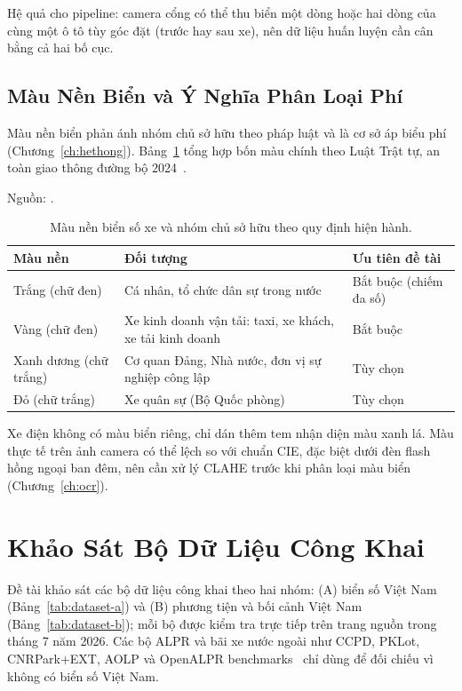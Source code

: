 Hệ quả cho pipeline: camera cổng có thể thu biển một dòng hoặc hai dòng của cùng một ô tô
tùy góc đặt (trước hay sau xe), nên dữ liệu huấn luyện cần cân bằng cả hai bố cục.

\subsection{Màu Nền Biển và Ý Nghĩa Phân Loại Phí}
\label{sec:maunenbien}

Màu nền biển phản ánh nhóm chủ sở hữu theo pháp luật và là cơ sở áp biểu phí
(Chương~\ref{ch:hethong}). Bảng~\ref{tab:maubienso} tổng hợp bốn màu chính theo Luật Trật
tự, an toàn giao thông đường bộ 2024~\autocite{luatttatgt2024}.

\begin{table}[htbp]
\centering
\caption{Màu nền biển số xe và nhóm chủ sở hữu theo quy định hiện hành.}

{\footnotesize Nguồn: \autocite{luatttatgt2024,tt792024bca}.}
\label{tab:maubienso}
\begin{tabular}{p{2.2cm} p{4.8cm} p{3.6cm}}
\toprule
\textbf{Màu nền} & \textbf{Đối tượng} & \textbf{Ưu tiên đề tài} \\
\midrule
Trắng (chữ đen) & Cá nhân, tổ chức dân sự trong nước & Bắt buộc (chiếm đa số) \\
Vàng (chữ đen) & Xe kinh doanh vận tải: taxi, xe khách, xe tải kinh doanh & Bắt buộc \\
Xanh dương (chữ trắng) & Cơ quan Đảng, Nhà nước, đơn vị sự nghiệp công lập & Tùy chọn \\
Đỏ (chữ trắng) & Xe quân sự (Bộ Quốc phòng) & Tùy chọn \\
\bottomrule
\end{tabular}
\end{table}

Xe điện không có màu biển riêng, chỉ dán thêm tem nhận diện màu xanh lá. Màu thực tế trên
ảnh camera có thể lệch so với chuẩn CIE, đặc biệt dưới đèn flash hồng ngoại ban đêm, nên
cần xử lý CLAHE trước khi phân loại màu biển (Chương~\ref{ch:ocr}).

\section{Khảo Sát Bộ Dữ Liệu Công Khai}
\label{sec:khaosatdataset}

Đề tài khảo sát các bộ dữ liệu công khai theo hai nhóm: (A) biển số Việt Nam
(Bảng~\ref{tab:dataset-a}) và (B) phương tiện và bối cảnh Việt Nam
(Bảng~\ref{tab:dataset-b}); mỗi bộ được kiểm tra trực tiếp trên trang nguồn trong tháng 7
năm 2026. Các bộ ALPR và bãi xe nước ngoài như CCPD, PKLot, CNRPark+EXT, AOLP và OpenALPR
benchmarks~\autocite{xu2018ccpd,almeida2015pklot,amato2017cnrpark,hsu2013aolp,openalpr2016benchmarks}
chỉ dùng để đối chiếu vì không có biển số Việt Nam.

